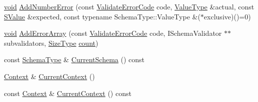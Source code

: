 \begin{DoxyCompactItemize}
\item 
\hyperlink{imgui__impl__opengl3__loader_8h_ac668e7cffd9e2e9cfee428b9b2f34fa7}{void} \hyperlink{classGenericSchemaValidator_a752965fdb585b99db45201579f8ff04a}{Add\+Number\+Error} (const \hyperlink{group__RAPIDJSON__ERRORS_ga2e1f88f94a5d9a6817a5de0ed2f0105a}{Validate\+Error\+Code} code, \hyperlink{classGenericSchemaValidator_a435890a2dddeecb896d4ac76de03ca68}{Value\+Type} \&actual, const \hyperlink{classGenericSchemaValidator_a3c004e35c7eb9fa5a28c0ccfb8ac62dc}{S\+Value} \&expected, const typename Schema\+Type\+::\+Value\+Type \&($\ast$exclusive)()=0)
\item 
\hyperlink{imgui__impl__opengl3__loader_8h_ac668e7cffd9e2e9cfee428b9b2f34fa7}{void} \hyperlink{classGenericSchemaValidator_aeaad9469f70e135ac75983e796818970}{Add\+Error\+Array} (const \hyperlink{group__RAPIDJSON__ERRORS_ga2e1f88f94a5d9a6817a5de0ed2f0105a}{Validate\+Error\+Code} code, I\+Schema\+Validator $\ast$$\ast$subvalidators, \hyperlink{rapidjson_8h_a5ed6e6e67250fadbd041127e6386dcb5}{Size\+Type} \hyperlink{imgui__impl__opengl3__loader_8h_a619bc20e8198de3bd3f3d7fc34de66b2}{count})
\item 
const \hyperlink{classGenericSchemaValidator_ac79628f00f6720bbabb70b44f0d076a0}{Schema\+Type} \& \hyperlink{classGenericSchemaValidator_ad00ad0a27d466e975de5e0f104e6962d}{Current\+Schema} () const
\item 
\hyperlink{classGenericSchemaValidator_ac6403619afb8aa8729e1e15d8c34d350}{Context} \& \hyperlink{classGenericSchemaValidator_a057dffa977f78cb7447a0850500cb2e0}{Current\+Context} ()
\item 
const \hyperlink{classGenericSchemaValidator_ac6403619afb8aa8729e1e15d8c34d350}{Context} \& \hyperlink{classGenericSchemaValidator_a9008095198e2f892e91f018db2fc0536}{Current\+Context} () const
\end{DoxyCompactItemize}
